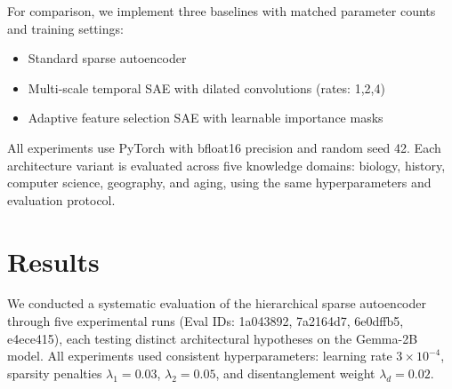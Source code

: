 \documentclass{article} %
\begin{document}
For comparison, we implement three baselines with matched parameter counts and training settings:
\begin{itemize}
    \item Standard sparse autoencoder
    \item Multi-scale temporal SAE with dilated convolutions (rates: 1,2,4)
    \item Adaptive feature selection SAE with learnable importance masks
\end{itemize}

All experiments use PyTorch with bfloat16 precision and random seed 42. Each architecture variant is evaluated across five knowledge domains: biology, history, computer science, geography, and aging, using the same hyperparameters and evaluation protocol.

\section{Results}
\label{sec:results}

We conducted a systematic evaluation of the hierarchical sparse autoencoder through five experimental runs (Eval IDs: 1a043892, 7a2164d7, 6e0dffb5, e4ece415), each testing distinct architectural hypotheses on the Gemma-2B model. All experiments used consistent hyperparameters: learning rate $3 \times 10^{-4}$, sparsity penalties $\lambda_1 = 0.03$, $\lambda_2 = 0.05$, and disentanglement weight $\lambda_d = 0.02$.
\end{document}
